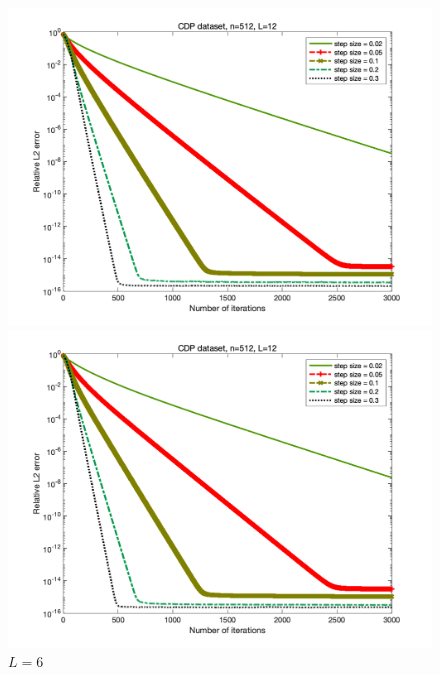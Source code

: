 \documentclass{article}
\begin{document}
\begin{figure}
	\begin{minipage}{0.33\linewidth}
		\centering
		\includegraphics[width=1\linewidth]{./fig/CDP+31.png}
		\caption{$L=3$}
	\end{minipage}
	\begin{minipage}{0.33\linewidth}
		\centering
		\includegraphics[width=1\linewidth]{./fig/CDP+32.png}
		\caption{$L=6$}
	\end{minipage}
	\begin{minipage}{0.33\linewidth}
		\centering

\end{minipage}
\end{figure}
\end{document}
